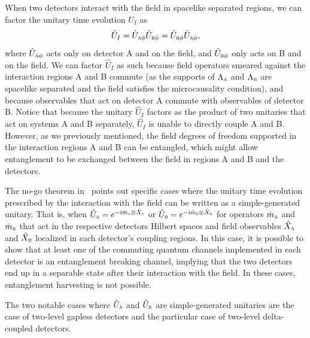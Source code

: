 \documentclass[letterpaper,12pt,titlepage,oneside,final]{book}
\newcommand{\ii}{\mathrm{i}}
\newcommand{\tc}[1]{\textsc{#1}}
\begin{document}
When two detectors interact with the field in spacelike separated regions, we can factor the unitary time evolution $\hat{U}_I$ as 
\begin{equation}
    \hat{U}_I  = \hat{U}_{\tc{a}\phi}\hat{U}_{\tc{b}\phi}= \hat{U}_{\tc{b}\phi}\hat{U}_{\tc{a}\phi},
\end{equation}
where $\hat{U}_{\tc{a}\phi}$ acts only on detector A and on the field, and $\hat{U}_{\tc{b}\phi}$ only acts on B and on the field. We can factor $\hat{U}_I$ as such because field operators smeared against the interaction regions A and B commute (as the supports of $\Lambda_\tc{a}$ and $\Lambda_\tc{b}$ are spacelike separated and the field satisfies the microcausality condition), and because observables that act on detector A commute with observables of detector B. Notice that because the unitary $\hat{U}_I$ factors as the product of two unitaries that act on systems A and B separately, $\hat{U}_I$ is unable to directly couple A and B. However, as we previously mentioned, the field degrees of freedom supported in the interaction regions A and B can be entangled, which might allow entanglement to be exchanged between the field in regions A and B and the detectors.

The no-go theorem in~\cite{nogo} points out specific cases where the unitary time evolution prescribed by the interaction with the field can be written as a simple-generated unitary. That is, when $\hat{U}_\tc{a} = e^{- \ii \hat{m}_\tc{a}\otimes \hat{X}_\tc{a}}$ or $\hat{U}_\tc{b} = e^{- \ii \hat{m}_\tc{b}\otimes \hat{X}_\tc{b}}$ for operators $\hat{m}_{\tc{a}}$ and $\hat{m}_{\tc{b}}$ that act in the respective detectors Hilbert spaces and field observables $\hat{X}_\tc{a}$ and $\hat{X}_\tc{b}$ localized in each detector's coupling regions. In this case, it is possible to show that at least one of the commuting quantum channels implemented in each detector is an entanglement breaking channel, implying that the two detectors end up in a separable state after their interaction with the field. In these cases, entanglement harvesting is not possible.

The two notable cases where $\hat{U}_\tc{a}$ and $\hat{U}_\tc{b}$ are simple-generated unitaries are the case of two-level gapless detectors and the particular case of two-level delta-coupled detectors. 
\end{document}
